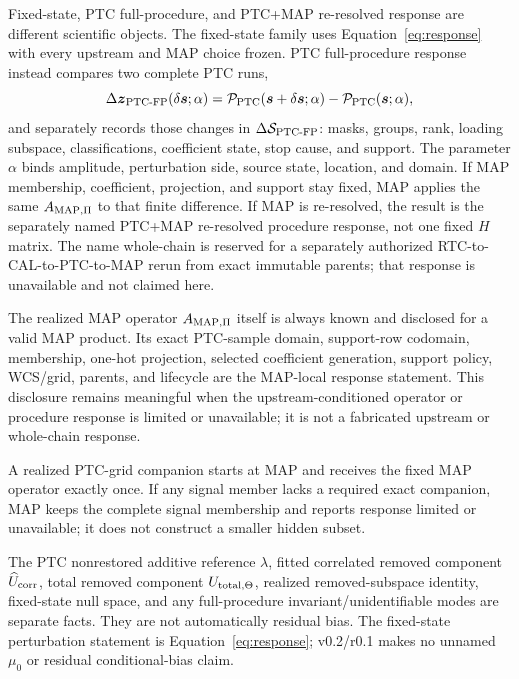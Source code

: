 \documentclass[10pt]{article}
\begin{document}
Fixed-state, PTC full-procedure, and PTC+MAP re-resolved response are different
scientific objects. The fixed-state family uses Equation~\eqref{eq:response}
with every upstream and MAP choice frozen. PTC full-procedure response instead
compares two complete PTC runs,
\[
 \Delta\boldsymbol z_{{\rm PTC}\text{-}{\rm FP}}(\delta\boldsymbol s;\alpha)
 =\mathcal P_{\rm PTC}(\boldsymbol s+\delta\boldsymbol s;\alpha)
  -\mathcal P_{\rm PTC}(\boldsymbol s;\alpha),
\]
and separately records those changes in
\(\Delta\mathcal S_{{\rm PTC}\text{-}{\rm FP}}\): masks, groups, rank, loading subspace,
classifications, coefficient state, stop cause, and support. The parameter
\(\alpha\) binds amplitude, perturbation side, source state, location, and
domain. If MAP membership, coefficient, projection, and support stay fixed,
MAP applies the same \(A_{{\rm MAP},\Pi}\) to that finite difference. If MAP
is re-resolved, the result is the separately named PTC+MAP re-resolved
procedure response, not one fixed \(H\) matrix. The name whole-chain is
reserved for a separately authorized RTC-to-CAL-to-PTC-to-MAP rerun from
exact immutable parents; that response is unavailable and not claimed here.

The realized MAP operator \(A_{{\rm MAP},\Pi}\) itself is always known and
disclosed for a valid MAP product. Its exact PTC-sample domain, support-row
codomain, membership, one-hot projection, selected coefficient generation,
support policy, WCS/grid, parents, and lifecycle are the MAP-local response
statement. This disclosure remains meaningful when the upstream-conditioned
operator or procedure response is limited or unavailable; it is not a
fabricated upstream or whole-chain response.

A realized PTC-grid companion starts at MAP and receives the fixed MAP
operator exactly once. If any signal member lacks a required exact companion,
MAP keeps the complete signal membership and reports response limited or
unavailable; it does not construct a smaller hidden subset.

The PTC nonrestored additive reference \(\lambda\), fitted correlated removed
component \(\widehat U_{\rm corr}\), total removed component
\(U_{{\rm total},\Theta}\), realized removed-subspace identity, fixed-state
null space, and any full-procedure invariant/unidentifiable modes are separate
facts. They are not automatically residual bias. The fixed-state perturbation
statement is Equation~\eqref{eq:response}; v0.2/r0.1 makes no unnamed \(\mu_0\) or
residual conditional-bias claim.
\end{document}
